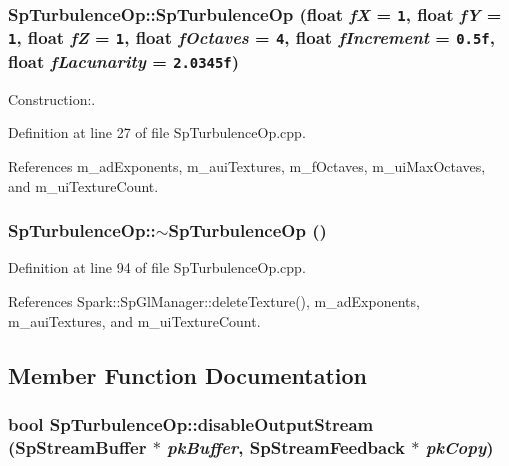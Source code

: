 \subsubsection{\setlength{\rightskip}{0pt plus 5cm}Sp\-Turbulence\-Op::Sp\-Turbulence\-Op (float {\em f\-X} = {\tt 1}, float {\em f\-Y} = {\tt 1}, float {\em f\-Z} = {\tt 1}, float {\em f\-Octaves} = {\tt 4}, float {\em f\-Increment} = {\tt 0.5f}, float {\em f\-Lacunarity} = {\tt 2.0345f})}\label{classSpark_1_1SpTurbulenceOp_a0}


Construction:. 

Definition at line 27 of file Sp\-Turbulence\-Op.cpp.

References m\_\-ad\-Exponents, m\_\-aui\-Textures, m\_\-f\-Octaves, m\_\-ui\-Max\-Octaves, and m\_\-ui\-Texture\-Count.
\subsubsection{\setlength{\rightskip}{0pt plus 5cm}Sp\-Turbulence\-Op::$\sim${\bf Sp\-Turbulence\-Op} ()\hspace{0.3cm}{\tt  [virtual]}}\label{classSpark_1_1SpTurbulenceOp_a1}


Definition at line 94 of file Sp\-Turbulence\-Op.cpp.

References Spark::Sp\-Gl\-Manager::delete\-Texture(), m\_\-ad\-Exponents, m\_\-aui\-Textures, and m\_\-ui\-Texture\-Count.

\subsection{Member Function Documentation}
\subsubsection{\setlength{\rightskip}{0pt plus 5cm}bool Sp\-Turbulence\-Op::disable\-Output\-Stream ({\bf Sp\-Stream\-Buffer} $\ast$ {\em pk\-Buffer}, {\bf Sp\-Stream\-Feedback} $\ast$ {\em pk\-Copy})\hspace{0.3cm}{\tt  [protected, virtual]}}\label{classSpark_1_1SpTurbulenceOp_b5}




